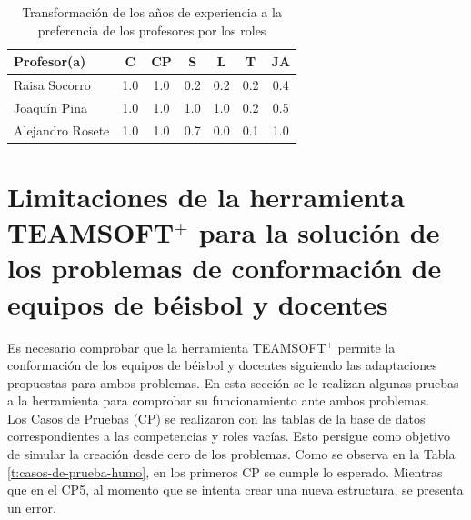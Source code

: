 \begin{table}[H]
	\centering
	\caption{Transformación de los años de experiencia a la preferencia de los profesores por los roles}\label{trans-prof}
	\hspace{-2cm}
	\begin{tabular}{l c c c c c c}
		\toprule[1.7pt]
		Profesor(a) & C   & CP  & S   & L   & T   & JA  \\ \midrule
		Raisa Socorro                             & 1.0 & 1.0 & 0.2 & 0.2 & 0.2 & 0.4 \\
		\rowcolor{gray!30} Joaquín Pina                              & 1.0 & 1.0 & 1.0 & 1.0 & 0.2 & 0.5 \\
		Alejandro Rosete                          & 1.0 & 1.0 & 0.7 & 0.0 & 0.1 & 1.0 \\
		\bottomrule[1pt]          
	\end{tabular}
\end{table}

\section{Limitaciones de la herramienta TEAMSOFT$^+$ para la solución de los problemas de conformación de equipos de béisbol y docentes}

Es necesario comprobar que la herramienta TEAMSOFT$^+$ permite la conformación de los equipos de béisbol y docentes siguiendo las adaptaciones propuestas para ambos problemas. En esta sección se le realizan algunas pruebas a la herramienta para comprobar su funcionamiento ante ambos problemas. \\

Los Casos de Pruebas (CP) se realizaron con las tablas de la base de datos correspondientes a las competencias y roles vacías. Esto persigue como objetivo de simular la creación desde cero de los problemas. Como se observa en la Tabla \ref{t:casos-de-prueba-humo}, en los primeros CP se cumple lo esperado. Mientras que en el CP5, al momento que se intenta crear una nueva estructura, se presenta un error.

